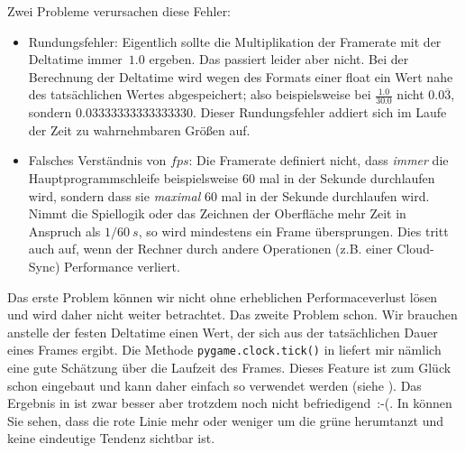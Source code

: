 
Zwei Probleme verursachen diese Fehler:

\begin{itemize}
    \item Rundungsfehler: Eigentlich sollte die Multiplikation der Framerate mit der Deltatime immer~$1.0$ ergeben. Das passiert leider aber nicht. Bei der Berechnung der Deltatime wird wegen des Formats einer \gls{float} ein Wert nahe des tatsächlichen Wertes abgespeichert; also beispielsweise bei $\frac{1.0}{30.0}$ nicht $0.0\overline{3}$, sondern $0.03333333333333330$. Dieser Rundungsfehler addiert sich im Laufe der Zeit zu wahrnehmbaren Größen auf.

    \item Falsches Verständnis von $fps$: Die Framerate definiert nicht, dass \emph{immer} die Hauptprogrammschleife beispielsweise 60 mal in der Sekunde durchlaufen wird, sondern dass sie \emph{maximal} 60 mal in der Sekunde durchlaufen wird. Nimmt die Spiellogik oder das Zeichnen der Oberfläche mehr Zeit in Anspruch als $1/60~s$, so wird mindestens ein Frame übersprungen. Dies tritt auch auf, wenn der Rechner durch andere Operationen (z.B. einer Cloud-Sync) Performance verliert. 
\end{itemize}

Das erste Problem können wir nicht ohne erheblichen Performaceverlust lösen und wird daher nicht weiter betrachtet. Das zweite Problem schon. Wir brauchen anstelle der festen Deltatime einen Wert, der sich aus der tatsächlichen Dauer eines Frames ergibt. Die Methode \texttt{pygame.clock.tick()} in  liefert mir nämlich eine gute Schätzung über die Laufzeit des Frames. Dieses Feature ist zum Glück schon eingebaut und kann daher einfach so verwendet werden (siehe ). Das Ergebnis in  ist zwar besser aber trotzdem noch nicht befriedigend~{:-(}. In  können Sie sehen, dass die rote Linie mehr oder weniger um die grüne herumtanzt und keine eindeutige Tendenz sichtbar ist.


\newpage
{}

